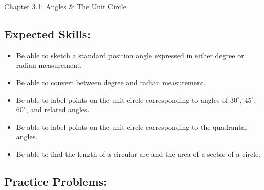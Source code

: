 \documentclass[12pt]{article}
\begin{document}
\begin{center}
\underline{\LARGE{Chapter 3.1: Angles \& The Unit Circle}}
\end{center}

\subsection*{Expected Skills:}

\begin{itemize}

\item Be able to sketch a standard position angle expressed in either degree or radian measurement.

\item Be able to convert between degree and radian measurement.

\item Be able to label points on the unit circle corresponding to angles of $30^\circ$, $45^\circ$, $60^\circ$, and related angles.

\item Be able to label points on the unit circle corresponding to the quadrantal angles.

\item Be able to find the length of a circular arc and the area of a sector of a circle.

\end{itemize}

\subsection*{Practice Problems: }
\end{document}
